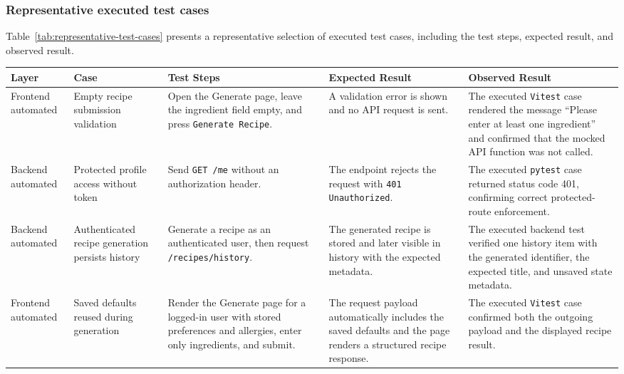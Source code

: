 \subsubsection{Representative executed test cases}

Table~\ref{tab:representative-test-cases} presents a representative
selection of executed test cases, including the test steps, expected
result, and observed result.

\begin{table}[H]
	\centering
	\scriptsize
	\renewcommand{\arraystretch}{1.2}
	\begin{tabularx}{\textwidth}{|>{\raggedright\arraybackslash}p{1.6cm}|>{\raggedright\arraybackslash}p{2.4cm}|>{\raggedright\arraybackslash}X|>{\raggedright\arraybackslash}X|>{\raggedright\arraybackslash}X|}
		\hline
		\textbf{Layer} & \textbf{Case} & \textbf{Test Steps} & \textbf{Expected Result} & \textbf{Observed Result} \\
		\hline
		Frontend automated & Empty recipe submission validation & Open the Generate page, leave the ingredient field empty, and press \texttt{Generate Recipe}. & A validation error is shown and no API request is sent. & The executed \texttt{Vitest} case rendered the message ``Please enter at least one ingredient'' and confirmed that the mocked API function was not called. \\
		\hline
		Backend automated & Protected profile access without token & Send \texttt{GET /me} without an authorization header. & The endpoint rejects the request with \texttt{401 Unauthorized}. & The executed \texttt{pytest} case returned status code 401, confirming correct protected-route enforcement. \\
		\hline
		Backend automated & Authenticated recipe generation persists history & Generate a recipe as an authenticated user, then request \texttt{/recipes/history}. & The generated recipe is stored and later visible in history with the expected metadata. & The executed backend test verified one history item with the generated identifier, the expected title, and unsaved state metadata. \\
		\hline
		Frontend automated & Saved defaults reused during generation & Render the Generate page for a logged-in user with stored preferences and allergies, enter only ingredients, and submit. & The request payload automatically includes the saved defaults and the page renders a structured recipe response. & The executed \texttt{Vitest} case confirmed both the outgoing payload and the displayed recipe result. \\

\end{tabularx}
\end{table}
